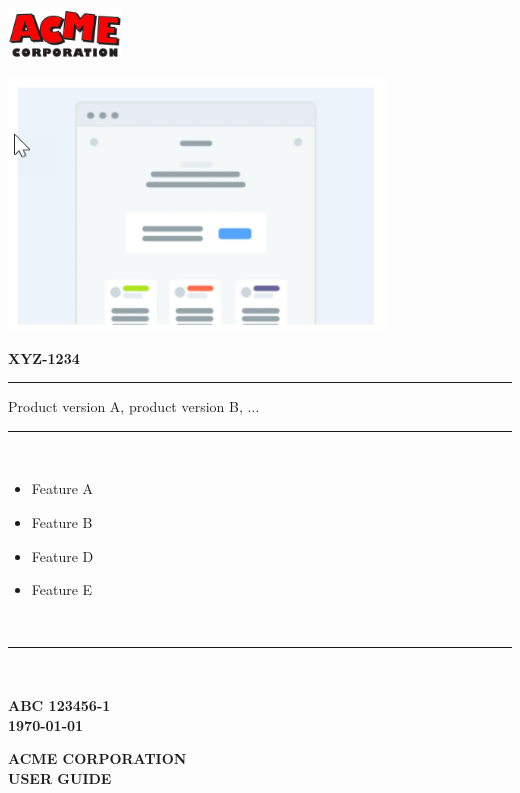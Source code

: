\documentclass[oneside]{book}
\newcommand{\productname}{\uppercase{\textbf{XYZ-1234}}}
\newcommand{\manufacturer}{\uppercase{\textbf{acme corporation}}}
\newcommand{\documentid}{\uppercase{\textbf{ABC 123456-1}}}
\newcommand{\publicationtype}{\uppercase{\textbf{user guide}}}
\newcommand{\publicationdate}{\uppercase{\textbf{\today}}}
\begin{document}
	\begin{titlepage}
		\begin{flushright}
			\includegraphics[width=3cm]{Acme-corp.png}
		\end{flushright}
		\vfil
		\begin{center}
			\includegraphics[width=10cm]{wireframe.png}
		\end{center}
		\vfil
		\Huge
		\productname \\
		\rule{\textwidth}{1pt}
		\Large
		Product version A, product version B, $\ldots$\\
		\rule{\textwidth}{1pt}\\[0.5em]
		\begin{minipage}{0.5\textwidth}
			\begin{itemize}
				\item Feature A
				\item Feature B
			\end{itemize}
		\end{minipage}
		\hfill
		\begin{minipage}{0.5\textwidth}
			\begin{flushright}
				\begin{itemize}
					\item Feature D
					\item Feature E
				\end{itemize}
			\end{flushright}
		\end{minipage}
		\\[0.5em]
		\rule{\textwidth}{1pt}\\[0.5em]
		\begin{minipage}{0.5\textwidth}
			\begin{flushleft}
				\documentid\\
				\publicationdate
			\end{flushleft}
		\end{minipage}
		\hfill
		\begin{minipage}{0.5\textwidth}
			\begin{flushright}
				\manufacturer\\ 
				\publicationtype
			\end{flushright}		
		\end{minipage}
	\end{titlepage}
\end{document}
